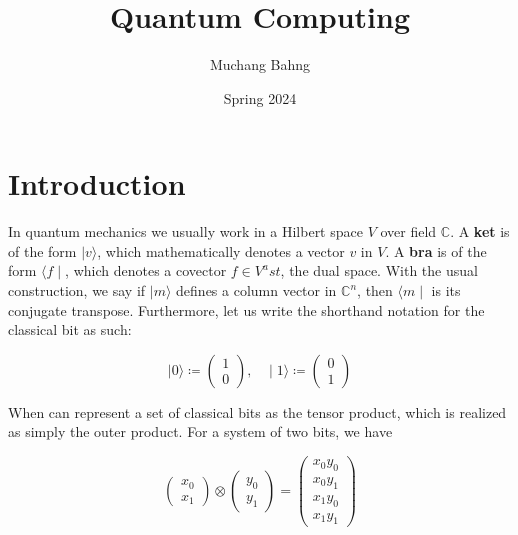 \documentclass{article}
\theoremstyle{definition}
\begin{document}
\pagestyle{fancy}

\cfoot{\thepage / \pageref{LastPage}}

\title{Quantum Computing}
\author{Muchang Bahng}
\date{Spring 2024}

\maketitle
\tableofcontents
\pagebreak 


\section{Introduction}

In quantum mechanics we usually work in a Hilbert space $V$ over field $\mathbb{C}$. A \textbf{ket} is of the form $\mid v \rangle$, which mathematically denotes a vector $v$ in $V$. A \textbf{bra} is of the form $\langle f \mid$, which denotes a covector $f \in V^ast$, the dual space. With the usual construction, we say if $\mid m \rangle$ defines a column vector in $\mathbb{C}^n$, then $\langle m \mid$ is its conjugate transpose. Furthermore, let us write the shorthand notation for the classical bit as such: 

  \[\mid 0 \rangle \coloneqq \begin{pmatrix} 1 \\ 0 \end{pmatrix} , \;\;\; \mid 1 \rangle \coloneqq \begin{pmatrix} 0 \\ 1 \end{pmatrix}\] 

When can represent a set of classical bits as the tensor product, which is realized as simply the outer product. For a system of two bits, we have 

  \[\begin{pmatrix} x_0 \\ x_1 \end{pmatrix} \otimes \begin{pmatrix} y_0 \\ y_1 \end{pmatrix} = \begin{pmatrix} x_0 y_0 \\ x_0 y_1 \\ x_1 y_0 \\ x_1 y_1 \end{pmatrix}\]
\end{document}
